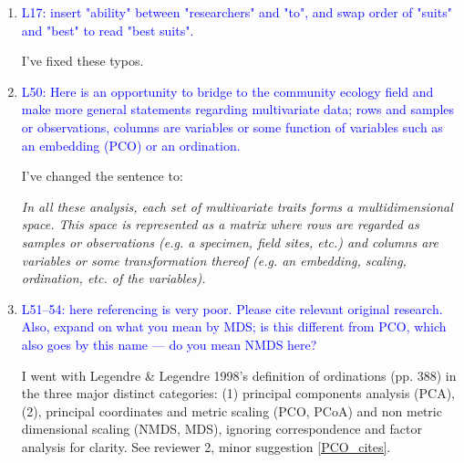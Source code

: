 \documentclass[12pt,letterpaper]{article}
\begin{document}
\begin{enumerate}

\item{\textcolor{blue}{L17: insert "ability" between "researchers" and "to", and swap order of "suits" and "best" to read "best suits".}}

I've fixed these typos.

\item{\textcolor{blue}{L50: Here is an opportunity to bridge to the community ecology field and make more general statements regarding multivariate data; rows and samples or observations, columns are variables or some function of variables such as an embedding (PCO) or an ordination.}}

I've changed the sentence to:
\label{rows}

\textit{In all these analysis, each set of multivariate traits forms a multidimensional space. This space is represented as a matrix where rows are regarded as samples or observations (e.g. a specimen, field sites, etc.) and columns are variables or some transformation thereof (e.g. an embedding, scaling, ordination, etc. of the variables).}

\item{\textcolor{blue}{L51--54: here referencing is very poor. Please cite relevant original research. Also, expand on what you mean by MDS; is this different from PCO, which also goes by this name --- do you mean NMDS here?}}

I went with Legendre \& Legendre 1998's definition of ordinations (pp. 388) in the three major distinct categories: (1) principal components analysis (PCA), (2), principal coordinates and metric scaling (PCO, PCoA) and non metric dimensional scaling (NMDS, MDS), ignoring correspondence and factor analysis for clarity. See reviewer 2, minor suggestion \ref{PCO_cites}.


\end{enumerate}
\end{document}
